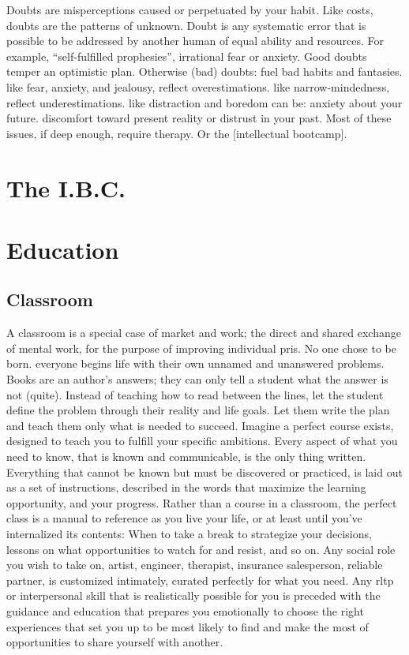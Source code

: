 \documentclass[
]{book}
\begin{document}
Doubts are misperceptions caused or perpetuated by your habit.
Like costs, doubts are the patterns of unknown.
Doubt is any systematic error that is possible to be addressed by another human of equal ability and resources.
For example, ``self-fulfilled prophesies'', irrational fear or anxiety.
Good doubts temper an optimistic plan.
Otherwise (bad) doubts: fuel bad habits and fantasies. like fear, anxiety, and jealousy, reflect overestimations. like narrow-mindedness, reflect underestimations. like distraction and boredom can be: anxiety about your future. discomfort toward present reality or distrust in your past.
Most of these issues, if deep enough, require therapy.
Or the {[}intellectual bootcamp{]}.

\hypertarget{the-i.b.c.}{%
\chapter*{The I.B.C.}\label{the-i.b.c.}}

\hypertarget{education}{%
\chapter{Education}\label{education}}

\hypertarget{classroom}{%
\section{Classroom}\label{classroom}}

A classroom is a special case of market and work; the direct and shared exchange of mental work, for the purpose of improving individual pris.
No one chose to be born. everyone begins life with their own unnamed and unanswered problems.
Books are an author's answers; they can only tell a student what the answer is not (quite).
Instead of teaching how to read between the lines, let the student define the problem through their reality and life goals.
Let them write the plan and teach them only what is needed to succeed.
Imagine a perfect course exists, designed to teach you to fulfill your specific ambitions.
Every aspect of what you need to know, that is known and communicable, is the only thing written.
Everything that cannot be known but must be discovered or practiced, is laid out as a set of instructions, described in the words that maximize the learning opportunity, and your progress.
Rather than a course in a classroom, the perfect class is a manual to reference as you live your life, or at least until you've internalized its contents:
When to take a break to strategize your decisions, lessons on what opportunities to watch for and resist, and so on.
Any social role you wish to take on, artist, engineer, therapist, insurance salesperson, reliable partner, is customized intimately, curated perfectly for what you need.
Any rltp or interpersonal skill that is realistically possible for you is preceded with the guidance and education that prepares you emotionally to choose the right experiences that set you up to be most likely to find and make the most of opportunities to share yourself with another.
\end{document}
